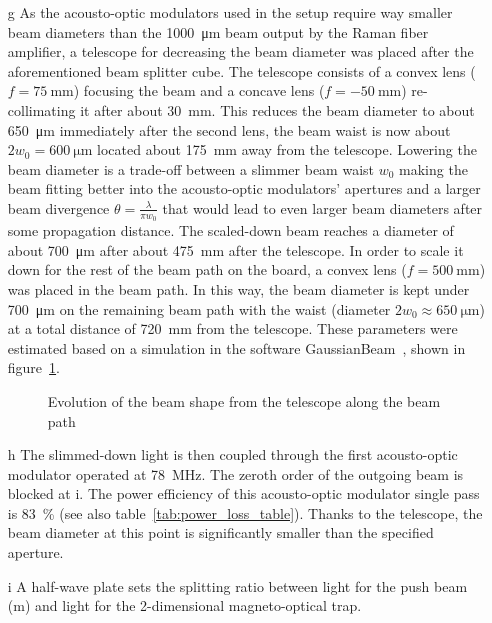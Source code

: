 \begin{itemize}
    \item[g] As the acousto-optic modulators used in the setup require way smaller beam diameters than the \SI{1000}{\micro\meter} beam output by the Raman fiber amplifier, a telescope for decreasing the beam diameter was placed after the aforementioned beam splitter cube. The telescope consists of a convex lens ($f = \SI{75}{\milli\meter}$) focusing the beam and a concave lens ($f = \SI{-50}{\milli\meter}$) re-collimating it after about \SI{30}{\milli\meter}. This reduces the beam diameter to about \SI{650}{\micro\meter} immediately after the second lens, the beam waist is now about $2w_0 = \SI{600}{\micro\meter}$ located about \SI{175}{\milli\meter} away from the telescope. Lowering the beam diameter is a trade-off between a slimmer beam waist $w_0$ making the beam fitting better into the acousto-optic modulators' apertures and a larger beam divergence $\theta = \frac{\lambda}{\pi w_0}$ that would lead to even larger beam diameters after some propagation distance. The scaled-down beam reaches a diameter of about \SI{700}{\micro\meter} after about \SI{475}{\milli\meter} after the telescope. In order to scale it down for the rest of the beam path on the board, a convex lens ($f = \SI{500}{\milli\meter}$) was placed in the beam path. In this way, the beam diameter is kept under \SI{700}{\micro\meter} on the remaining beam path with the waist (diameter $2w_0 \approx \SI{650}{\micro\meter}$) at a total distance of \SI{720}{\milli\meter} from the telescope.  These parameters were estimated based on a simulation in the software GaussianBeam~\cite{noauthor_gaussianbeam_nodate}, shown in figure~\ref{fig:beam_diameter_evolution}.

\begin{figure}
    \caption{Evolution of the beam shape from the telescope along the beam path
    }
    \label{fig:beam_diameter_evolution}
\end{figure}

    \item[h] The slimmed-down light is then coupled through the first acousto-optic modulator operated at \SI{+78}{\mega\hertz}. The zeroth order of the outgoing beam is blocked at i. The power efficiency of this acousto-optic modulator single pass is \SI{83}{\percent} (see also table~\ref{tab:power_loss_table}). Thanks to the telescope, the beam diameter at this point is significantly smaller than the specified aperture.
    
    \item[i] A half-wave plate sets the splitting ratio between light for the push beam (m) and light for the 2-dimensional magneto-optical trap.
    

\end{itemize}
